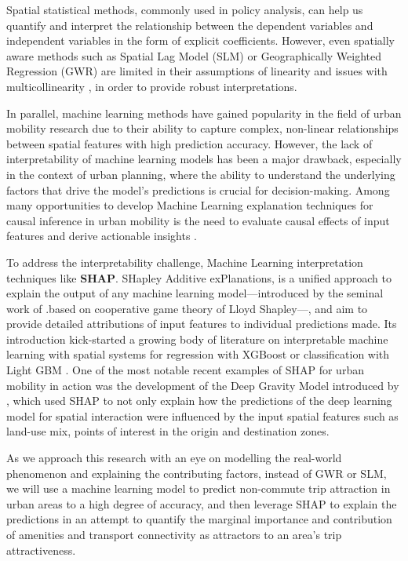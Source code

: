 Spatial statistical methods, commonly used in policy analysis, can help us quantify and interpret the relationship between the dependent variables and independent variables in the form of explicit coefficients. However, even spatially aware methods such as Spatial Lag Model (SLM) or Geographically Weighted Regression (GWR) are limited in their assumptions of linearity and issues with multicollinearity \citep{wheelerMulticollinearityCorrelationLocal2005}, in order to provide robust interpretations.

In parallel, machine learning methods have gained popularity in the field of urban mobility research due to their ability to capture complex, non-linear relationships between spatial features with high prediction accuracy. However, the lack of interpretability of machine learning models has been a major drawback, especially in the context of urban planning, where the ability to understand the underlying factors that drive the model's predictions is crucial for decision-making. Among many opportunities to develop Machine Learning explanation techniques for causal inference in urban mobility is the need to evaluate causal effects of input features and derive actionable insights \citep{xinVisionPaperCausal2022}.

To address the interpretability challenge, Machine Learning interpretation techniques like \textbf{SHAP}. SHapley Additive exPlanations, is a unified approach to explain the output of any machine learning model---introduced by the seminal work of \citet{lundbergUnifiedApproachInterpreting2017a}.based on cooperative game theory of Lloyd Shapley---, and aim to provide detailed attributions of input features to individual predictions made. Its introduction kick-started a growing body of literature on interpretable machine learning with spatial systems for regression with XGBoost \citep{liExtractingSpatialEffects2022} or classification with Light GBM \citep{louhichiShapleyValuesExplaining2023}. One of the most notable recent examples of SHAP for urban mobility in action was the development of the Deep Gravity Model introduced by \cite{siminiDeepGravityModel2021}, which used SHAP to not only explain how the predictions of the deep learning model for spatial interaction were influenced by the input spatial features such as land-use mix, points of interest in the origin and destination zones. 

As we approach this research with an eye on modelling the real-world phenomenon and explaining the contributing factors, instead of GWR or SLM, we will use a machine learning model to predict non-commute trip attraction in urban areas to a high degree of accuracy, and then leverage SHAP to explain the predictions in an attempt to quantify the marginal importance and contribution of amenities and transport connectivity as attractors to an area's trip attractiveness.


